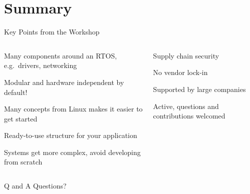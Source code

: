 \documentclass[10pt, aspectratio=169]{beamer}
\begin{document}
\section{Summary}
\begin{frame}[fragile]{Key Points from the Workshop\footnotemark}
  \begin{columns}
    \begin{column}{0.6\textwidth}
      \begin{description}
        \item [Ecosystem] Many components around an RTOS, e.g.~drivers, networking
        \item Modular and hardware independent by default!
        \item Many concepts from Linux makes it easier to get started
        \item [Structure] Ready-to-use structure for your application
        \item Systems get more complex, avoid developing from scratch
      \end{description}
    \end{column}
    \begin{column}{0.4\textwidth}
      \begin{description}
        \item [Open Source] Supply chain security
        \item No vendor lock-in
        \item Supported by large companies
        \item [Community] Active, questions and contributions welcomed
      \end{description}
    \end{column}
  \end{columns}
\end{frame}
\begin{frame}{Q and A}
  \centering
  \LARGE Questions?

\end{frame}
\appendix
\end{document}

